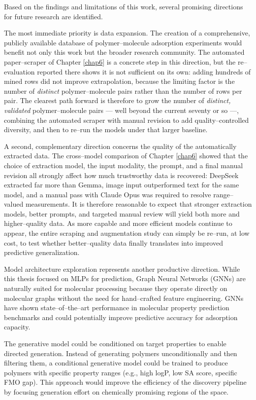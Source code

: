 Based on the findings and limitations of this work, several promising directions for future research are identified.

The most immediate priority is data expansion. The creation of a comprehensive, publicly available database of polymer--molecule adsorption experiments would benefit not only this work but the broader research community. The automated paper--scraper of Chapter \ref{chap6} is a concrete step in this direction, but the re--evaluation reported there shows it is not sufficient on its own: adding hundreds of mined rows did not improve extrapolation, because the limiting factor is the number of \emph{distinct} polymer--molecule pairs rather than the number of rows per pair. The clearest path forward is therefore to grow the number of \emph{distinct, validated} polymer--molecule pairs --- well beyond the current seventy or so ---, combining the automated scraper with manual revision to add quality--controlled diversity, and then to re--run the models under that larger baseline.

A second, complementary direction concerns the quality of the automatically extracted data. The cross--model comparison of Chapter \ref{chap6} showed that the choice of extraction model, the input modality, the prompt, and a final manual revision all strongly affect how much trustworthy data is recovered: DeepSeek extracted far more than Gemma, image input outperformed text for the same model, and a manual pass with Claude Opus was required to resolve range--valued measurements. It is therefore reasonable to expect that stronger extraction models, better prompts, and targeted manual review will yield both more and higher--quality data. As more capable and more efficient models continue to appear, the entire scraping and augmentation study can simply be re--run, at low cost, to test whether better--quality data finally translates into improved predictive generalization.

Model architecture exploration represents another productive direction. While this thesis focused on MLPs for prediction, Graph Neural Networks (GNNs) are naturally suited for molecular processing because they operate directly on molecular graphs without the need for hand--crafted feature engineering. GNNs have shown state--of--the--art performance in molecular property prediction benchmarks and could potentially improve predictive accuracy for adsorption capacity.

The generative model could be conditioned on target properties to enable directed generation. Instead of generating polymers unconditionally and then filtering them, a conditional generative model could be trained to produce polymers with specific property ranges (e.g., high logP, low SA score, specific FMO gap). This approach would improve the efficiency of the discovery pipeline by focusing generation effort on chemically promising regions of the space.


